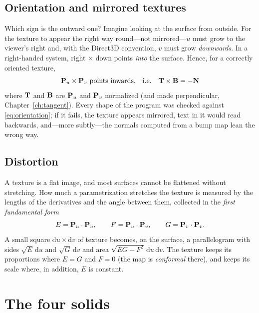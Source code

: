 \subsection{Orientation and mirrored textures}
\label{sec:orientation}
Which sign is the outward one? Imagine looking at the surface from outside. For the texture
to appear the right way round---not mirrored---$u$ must grow to the viewer's right and, with
the Direct3D convention, $v$ must grow \emph{downwards}. In a right-handed system,
right $\times$ down points \emph{into} the surface. Hence, for a correctly oriented texture,
\begin{equation}
  \label{eq:orientation}
  \mathbf{P}_u \times \mathbf{P}_v \ \text{points inwards,\quad i.e.}\quad
  \mathbf{T}\times\mathbf{B} = -\mathbf{N}
\end{equation}
where $\mathbf{T}$ and $\mathbf{B}$ are $\mathbf{P}_u$ and $\mathbf{P}_v$ normalized (and made perpendicular,
Chapter~\ref{ch:tangent}). Every shape of the program was checked against
\eqref{eq:orientation}; if it fails, the texture appears mirrored, text in it would read
backwards, and---more subtly---the normals computed from a bump map lean the wrong way.

\subsection{Distortion}
A texture is a flat image, and most surfaces cannot be flattened without stretching. How
much a parametrization stretches the texture is measured by the lengths of the derivatives and
the angle between them, collected in the \emph{first fundamental form}
\[
  E = \mathbf{P}_u\cdot\mathbf{P}_u,\qquad F = \mathbf{P}_u\cdot\mathbf{P}_v,\qquad G = \mathbf{P}_v\cdot\mathbf{P}_v .
\]
A small square $\mathrm du\times\mathrm dv$ of texture becomes, on the surface, a
parallelogram with sides $\sqrt E\,\mathrm du$ and $\sqrt G\,\mathrm dv$ and area
$\sqrt{EG-F^2}\,\mathrm du\,\mathrm dv$. The texture keeps its proportions where
$E=G$ and $F=0$ (the map is \emph{conformal} there), and keeps its scale where, in addition,
$E$ is constant.

\section{The four solids}

